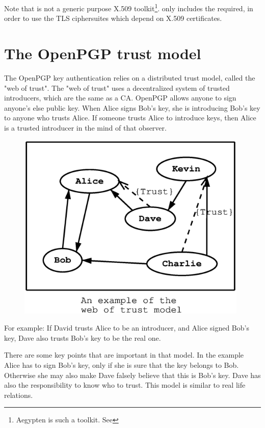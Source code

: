 \par
Note that \gnutls{} is not a generic purpose X.509 toolkit\footnote{Aegypten is such a toolkit. See 
}. 
\gnutls{} only includes the required,
in order to use the TLS ciphersuites which depend on X.509 certificates.


\section{The OpenPGP trust model}
\label{pgp:trust}

The OpenPGP key authentication relies on a distributed trust model, called
the "web of trust". The "web of trust" uses a decentralized system of 
trusted introducers, which are the same as a CA. OpenPGP allows anyone to 
sign anyone's else public key. When Alice signs Bob's key, she is introducing 
Bob's key to anyone who trusts Alice. If someone trusts Alice to introduce
keys, then Alice is a trusted introducer in the mind of that observer.

\begin{figure}[hbtp]
\includegraphics[height=9cm,width=11cm]{pgp-fig1}
\label{fig:pgp1}
\end{figure}

For example: If David trusts Alice to be an introducer, and Alice signed
Bob's key, Dave also trusts Bob's key to be the real one.

There are some key points that are important in that model. In the example
Alice has to sign Bob's key, only if she is sure that the key belongs
to Bob. Otherwise she may also make Dave falsely believe that this
is Bob's key. Dave has also the responsibility to know who to trust.
This model is similar to real life relations.

